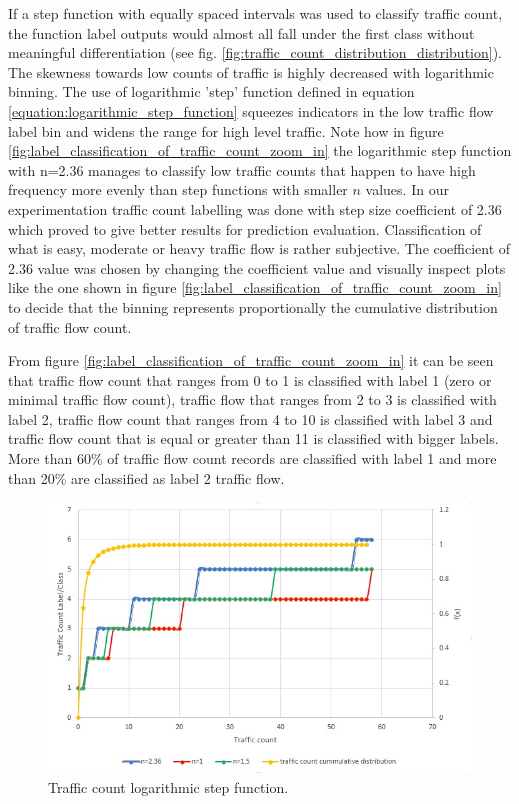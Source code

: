 \documentclass[12pt, a4paper]{report}
\theoremstyle{definition}
\theoremstyle{definition}%
\theoremstyle{definition}%
\theoremstyle{definition}%
\theoremstyle{definition}%
\theoremstyle{definition}%
\begin{document}
If a step function with equally spaced intervals was used to classify traffic count, the function label outputs would almost all fall under the first class without meaningful differentiation (see fig. \ref{fig:traffic_count_distribution_distribution}). The skewness towards low counts of traffic is highly decreased with logarithmic binning. The use of logarithmic 'step' function defined in equation \ref{equation:logarithmic_step_function} squeezes indicators in the low traffic flow label bin and widens the range for high level traffic. Note how in figure \ref{fig:label_classification_of_traffic_count_zoom_in} the logarithmic step function with n=2.36 manages to classify low traffic counts that happen to have high frequency more evenly than step functions with smaller $n$ values. In our experimentation traffic count labelling was done with step size coefficient of 2.36 which proved to give better results for prediction evaluation. Classification of what is easy, moderate or heavy traffic flow is rather subjective. The coefficient of 2.36 value was chosen by changing the coefficient value and visually inspect plots like the one shown in figure \ref{fig:label_classification_of_traffic_count_zoom_in} to decide that the binning represents proportionally the cumulative distribution of traffic flow count. 

From figure \ref{fig:label_classification_of_traffic_count_zoom_in} it can be seen that traffic flow count that ranges from 0 to 1 is classified with label 1 (zero or minimal traffic flow count), traffic flow that ranges from 2 to 3 is classified with label 2, traffic flow count that ranges from 4 to 10 is classified with label 3 and traffic flow count that is equal or greater than 11 is classified with bigger labels. More than 60\% of traffic flow count records are classified with label 1 and more than 20\% are classified as label 2 traffic flow. 
 
\begin{figure}[!]	
	\includegraphics[scale=0.60]{steps_function.jpg}
	\centering
	\caption{Traffic count logarithmic step function. }
	\label{fig:label_classification_of_traffic_count}
\end{figure}
\end{document}
